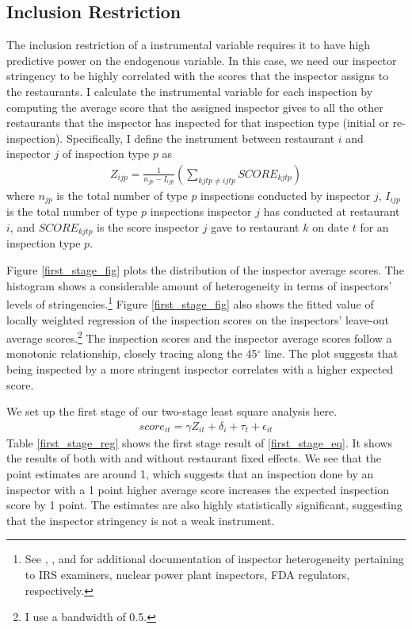 \documentclass[12pt]{article}
\begin{document}
\subsection{Inclusion Restriction}
\label{IV_construct}
The inclusion restriction of a instrumental variable requires it to have high predictive power on the endogenous variable. In this case, we need our inspector stringency to be highly correlated with the scores that the inspector assigns to the restaurants. I calculate the instrumental variable for each inspection by computing the average score that the assigned inspector gives to all the other restaurants that the inspector has inspected for that inspection type (initial or re-inspection). Specifically, I define the instrument between restaurant $i$ and inspector $j$ of inspection type $p$ as
\begin{align*}
    Z_{ijp} = \frac{1}{n_{jp} - I_{ijp}} \left( \sum_{kjtp\neq ijtp}  SCORE_{kjtp}\right)
\end{align*}
where $n_{jp}$ is the total number of type $p$ inspections conducted by inspector $j$, $I_{ijp}$ is the total number of type $p$ inspections inspector $j$ has conducted at restaurant $i$, and $SCORE_{kjtp}$ is the score inspector $j$ gave to restaurant $k$ on date $t$ for an inspection type $p$.

Figure \ref{first_stage_fig} plots the distribution of the inspector average scores. The histogram shows a considerable amount of heterogeneity in terms of inspectors' levels of stringencies.\footnote{See \cite{Feinstein_89}, \cite{Feinstein_91}, and \cite{Macher_11} for additional documentation of inspector heterogeneity pertaining to IRS examiners, nuclear power plant inspectors, FDA regulators, respectively.} Figure \ref{first_stage_fig} also shows the fitted value of locally weighted regression of the inspection scores on the inspectors' leave-out average scores.\footnote{I use a bandwidth of 0.5.} The inspection scores and the inspector average scores follow a monotonic relationship, closely tracing along the 45$^\circ$ line. The plot suggests that being inspected by a more stringent inspector correlates with a higher expected score. 

We set up the first stage of our two-stage least square analysis here. 
\begin{align}
score_{it} = \gamma Z_{it} + \delta_i + \tau_t + \epsilon_{it}
\label{first_stage_eq}
\end{align}
Table \ref{first_stage_reg} shows the first stage result of \eqref{first_stage_eq}. It shows the results of both with and without restaurant fixed effects. We see that the point estimates are around 1, which suggests that an inspection done by an inspector with a 1 point higher average score increases the expected inspection score by 1 point. The estimates are also highly statistically significant, suggesting that the inspector stringency is not a weak instrument. 
\end{document}
